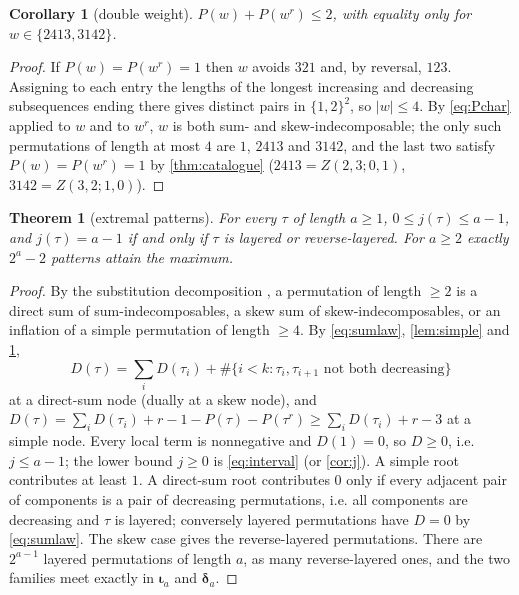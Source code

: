 \documentclass[11pt,reqno]{amsart}
\theoremstyle{plain}
\newtheorem{theorem}{Theorem}[section]
\newtheorem{corollary}[corollary]{Corollary}
\theoremstyle{definition}
\theoremstyle{remark}
\let\greekiota\iota
\renewcommand{\iota}{\boldsymbol{\greekiota}}
\newcommand{\dd}{\boldsymbol{\delta}}
\begin{document}
\begin{corollary}[double weight]\label{cor:double}
$P(w)+P(w^r)\le2$, with equality only for $w\in\{2413,3142\}$.
\end{corollary}

\begin{proof}
If $P(w)=P(w^r)=1$ then $w$ avoids $321$ and, by reversal, $123$. Assigning to each entry the lengths of the longest increasing and decreasing subsequences ending there gives distinct pairs in $\{1,2\}^2$, so $|w|\le4$. By \eqref{eq:Pchar} applied to $w$ and to $w^r$, $w$ is both sum- and skew-indecomposable; the only such permutations of length at most $4$ are $1$, $2413$ and $3142$, and the last two satisfy $P(w)=P(w^r)=1$ by \cref{thm:catalogue} ($2413=Z(2,3;0,1)$, $3142=Z(3,2;1,0)$).
\end{proof}

\begin{theorem}[extremal patterns]\label{thm:extremal}
For every $\tau$ of length $a\ge1$, $0\le j(\tau)\le a-1$, and $j(\tau)=a-1$ if and only if $\tau$ is layered or reverse-layered. For $a\ge2$ exactly $2^a-2$ patterns attain the maximum.
\end{theorem}

\begin{proof}
By the substitution decomposition \cite{BHV2008}, a permutation of length $\ge2$ is a direct sum of sum-indecomposables, a skew sum of skew-indecomposables, or an inflation of a simple permutation of length $\ge4$. By \eqref{eq:sumlaw}, \cref{lem:simple} and \cref{cor:double},
\[
D(\tau)=\sum_i D(\tau_i)+\#\{i<k:\tau_i,\tau_{i+1}\text{ not both decreasing}\}
\]
at a direct-sum node (dually at a skew node), and $D(\tau)=\sum_iD(\tau_i)+r-1-P(\tau)-P(\tau^r)\ge\sum_iD(\tau_i)+r-3$ at a simple node. Every local term is nonnegative and $D(1)=0$, so $D\ge0$, i.e. $j\le a-1$; the lower bound $j\ge0$ is \eqref{eq:interval} (or \cref{cor:j}). A simple root contributes at least $1$. A direct-sum root contributes $0$ only if every adjacent pair of components is a pair of decreasing permutations, i.e. all components are decreasing and $\tau$ is layered; conversely layered permutations have $D=0$ by \eqref{eq:sumlaw}. The skew case gives the reverse-layered permutations. There are $2^{a-1}$ layered permutations of length $a$, as many reverse-layered ones, and the two families meet exactly in $\iota_a$ and $\dd_a$.
\end{proof}
\end{document}
